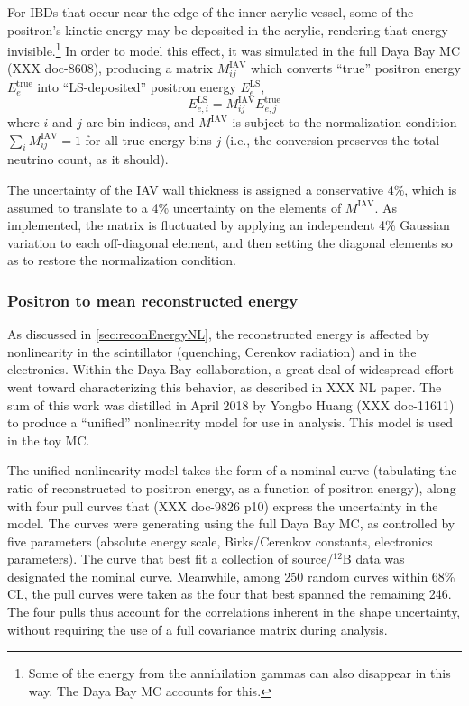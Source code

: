 \documentclass[../thesis.tex]{subfiles}
\begin{document}
\newcommand\Miav{M^{\mathrm{IAV}}}
\newcommand\Eetrue[1]{E^{\mathrm{true}}_{e#1}}
\newcommand\Eels[1]{E^{\mathrm{LS}}_{e#1}}

For IBDs that occur near the edge of the inner acrylic vessel, some of the positron's kinetic energy may be deposited in the acrylic, rendering that energy invisible.\footnote{Some of the energy from the annihilation gammas can also disappear in this way. The Daya Bay MC accounts for this.} In order to model this effect, it was simulated in the full Daya Bay MC (XXX doc-8608), producing a matrix $\Miav_{ij}$ which converts ``true'' positron energy $\Eetrue{}$ into ``LS-deposited'' positron energy $\Eels{}$,
\begin{equation*}
  \Eels{,i} = \Miav_{ij} \Eetrue{,j}
\end{equation*}
where $i$ and $j$ are bin indices, and $\Miav$ is subject to the normalization condition $\sum_i\Miav_{ij} = 1$ for all true energy bins $j$ (i.e., the conversion preserves the total neutrino count, as it should).

The uncertainty of the IAV wall thickness is assigned a conservative 4\%, which is assumed to translate to a 4\% uncertainty on the elements of $\Miav$. As implemented, the matrix is fluctuated by applying an independent 4\% Gaussian variation to each off-diagonal element, and then setting the diagonal elements so as to restore the normalization condition.

\subsubsection{Positron to mean reconstructed energy}

As discussed in \autoref{sec:reconEnergyNL}, the reconstructed energy is affected by nonlinearity in the scintillator (quenching, Cerenkov radiation) and in the electronics. Within the Daya Bay collaboration, a great deal of widespread effort went toward characterizing this behavior, as described in XXX NL paper. The sum of this work was distilled in April 2018 by Yongbo Huang (XXX doc-11611) to produce a ``unified'' nonlinearity model for use in analysis. This model is used in the toy MC.

The unified nonlinearity model takes the form of a nominal curve (tabulating the ratio of reconstructed to positron energy, as a function of positron energy), along with four pull curves that (XXX doc-9826 p10) express the uncertainty in the model. The curves were generating using the full Daya Bay MC, as controlled by five parameters (absolute energy scale, Birks/Cerenkov constants, electronics parameters). The curve that best fit a collection of source/$^{12}$B data was designated the nominal curve. Meanwhile, among 250 random curves within 68\% CL, the pull curves were taken as the four that best spanned the remaining 246. The four pulls thus account for the correlations inherent in the shape uncertainty, without requiring the use of a full covariance matrix during analysis.
\end{document}
